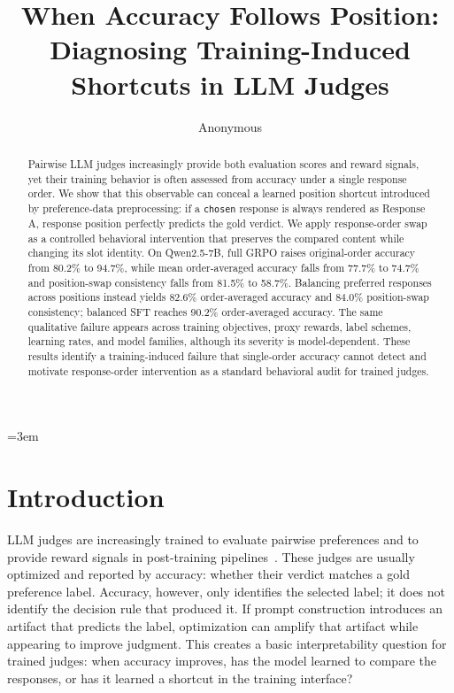 \documentclass[11pt]{article}
\title{When Accuracy Follows Position: Diagnosing Training-Induced Shortcuts in LLM Judges}
\author{Anonymous}
\begin{document}
\emergencystretch=3em
\maketitle

\begin{abstract}
Pairwise LLM judges increasingly provide both evaluation scores and reward signals, yet their training behavior is often assessed from accuracy under a single response order. We show that this observable can conceal a learned position shortcut introduced by preference-data preprocessing: if a \texttt{chosen} response is always rendered as Response A, response position perfectly predicts the gold verdict. We apply response-order swap as a controlled behavioral intervention that preserves the compared content while changing its slot identity. On Qwen2.5-7B, full GRPO raises original-order accuracy from 80.2\% to 94.7\%, while mean order-averaged accuracy falls from 77.7\% to 74.7\% and position-swap consistency falls from 81.5\% to 58.7\%. Balancing preferred responses across positions instead yields 82.6\% order-averaged accuracy and 84.0\% position-swap consistency; balanced SFT reaches 90.2\% order-averaged accuracy. The same qualitative failure appears across training objectives, proxy rewards, label schemes, learning rates, and model families, although its severity is model-dependent. These results identify a training-induced failure that single-order accuracy cannot detect and motivate response-order intervention as a standard behavioral audit for trained judges.
\end{abstract}

\section{Introduction}

LLM judges are increasingly trained to evaluate pairwise preferences and to provide reward signals in post-training pipelines~\citep{zheng2023judging,zheng2024arena}. These judges are usually optimized and reported by accuracy: whether their verdict matches a gold preference label. Accuracy, however, only identifies the selected label; it does not identify the decision rule that produced it. If prompt construction introduces an artifact that predicts the label, optimization can amplify that artifact while appearing to improve judgment. This creates a basic interpretability question for trained judges: when accuracy improves, has the model learned to compare the responses, or has it learned a shortcut in the training interface?
\end{document}
